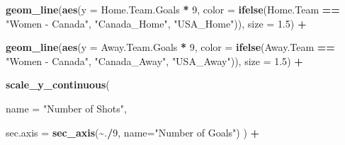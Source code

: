 \documentclass[
  a3paper,
]{article}
\newenvironment{Shaded}{\begin{snugshade}}{\end{snugshade}}
\newcommand{\AttributeTok}[1]{\textcolor[rgb]{0.13,0.29,0.53}{#1}}
\newcommand{\DecValTok}[1]{\textcolor[rgb]{0.00,0.00,0.81}{#1}}
\newcommand{\FloatTok}[1]{\textcolor[rgb]{0.00,0.00,0.81}{#1}}
\newcommand{\FunctionTok}[1]{\textcolor[rgb]{0.13,0.29,0.53}{\textbf{#1}}}
\newcommand{\NormalTok}[1]{#1}
\newcommand{\SpecialCharTok}[1]{\textcolor[rgb]{0.81,0.36,0.00}{\textbf{#1}}}
\newcommand{\StringTok}[1]{\textcolor[rgb]{0.31,0.60,0.02}{#1}}
\begin{document}
\begin{Shaded}
\begin{Highlighting}[]
   \FunctionTok{geom\_line}\NormalTok{(}\FunctionTok{aes}\NormalTok{(}\AttributeTok{y =}\NormalTok{ Home.Team.Goals }\SpecialCharTok{*} \DecValTok{9}\NormalTok{, }\AttributeTok{color =} \FunctionTok{ifelse}\NormalTok{(Home.Team }\SpecialCharTok{==} \StringTok{"Women {-} Canada"}\NormalTok{, }\StringTok{"Canada\_Home"}\NormalTok{, }\StringTok{"USA\_Home"}\NormalTok{)), }\AttributeTok{size =} \FloatTok{1.5}\NormalTok{) }\SpecialCharTok{+}
  
  \FunctionTok{geom\_line}\NormalTok{(}\FunctionTok{aes}\NormalTok{(}\AttributeTok{y =}\NormalTok{ Away.Team.Goals }\SpecialCharTok{*} \DecValTok{9}\NormalTok{, }\AttributeTok{color =} \FunctionTok{ifelse}\NormalTok{(Away.Team }\SpecialCharTok{==} \StringTok{"Women {-} Canada"}\NormalTok{, }\StringTok{"Canada\_Away"}\NormalTok{, }\StringTok{"USA\_Away"}\NormalTok{)), }\AttributeTok{size =} \FloatTok{1.5}\NormalTok{) }\SpecialCharTok{+}
  
    \FunctionTok{scale\_y\_continuous}\NormalTok{(}
    
    \AttributeTok{name =} \StringTok{"Number of Shots"}\NormalTok{,}
    
    \AttributeTok{sec.axis =} \FunctionTok{sec\_axis}\NormalTok{(}\SpecialCharTok{\textasciitilde{}}\NormalTok{.}\SpecialCharTok{/}\DecValTok{9}\NormalTok{, }\AttributeTok{name=}\StringTok{"Number of Goals"}\NormalTok{)}
\NormalTok{  ) }\SpecialCharTok{+} 
  

\end{Highlighting}
\end{Shaded}
\end{document}
